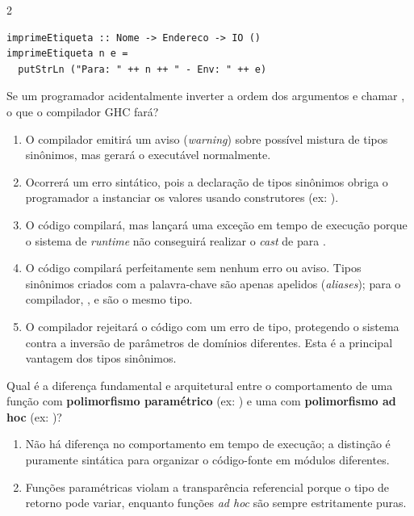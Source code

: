\documentclass[a4paper,10pt,brazil]{article}
\begin{document}
\begin{multicols}{2}
\begin{verbatim}
imprimeEtiqueta :: Nome -> Endereco -> IO ()
imprimeEtiqueta n e =
  putStrLn ("Para: " ++ n ++ " - Env: " ++ e)
\end{verbatim}

Se um programador acidentalmente inverter a ordem dos argumentos e chamar , o que o compilador GHC fará?

\begin{enumerate}
  \item O compilador emitirá um aviso (\emph{warning}) sobre possível mistura de tipos sinônimos, mas gerará o executável normalmente.

  \item Ocorrerá um erro sintático, pois a declaração de tipos sinônimos obriga o programador a instanciar os valores usando construtores (ex: ).

  \item O código compilará, mas lançará uma exceção em tempo de execução porque o sistema de \emph{runtime} não conseguirá realizar o \emph{cast} de  para .

  \item O código compilará perfeitamente sem nenhum erro ou aviso. Tipos sinônimos criados com a palavra-chave  são apenas apelidos (\emph{aliases}); para o compilador, ,  e  são o mesmo tipo.

  \item O compilador rejeitará o código com um erro de tipo, protegendo o sistema contra a inversão de parâmetros de domínios diferentes. Esta é a principal vantagem dos tipos sinônimos.


\end{enumerate}

Qual é a diferença fundamental e arquitetural entre o comportamento de uma função com \textbf{polimorfismo paramétrico} (ex: ) e uma com \textbf{polimorfismo ad hoc} (ex: )?

\begin{enumerate}
  \item Não há diferença no comportamento em tempo de execução; a distinção é puramente sintática para organizar o código-fonte em módulos diferentes.

  \item Funções paramétricas violam a transparência referencial porque o tipo de retorno pode variar, enquanto funções \emph{ad hoc} são sempre estritamente puras.


\end{enumerate}
\end{multicols}
\end{document}
